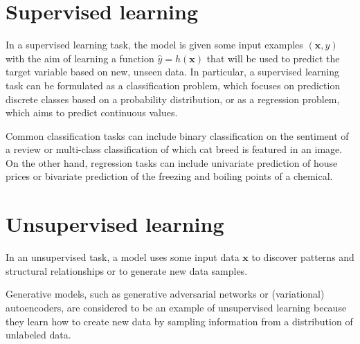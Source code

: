 \documentclass{report}
\begin{document}
\section{Supervised learning}
In a supervised learning task, the model is given some input examples $\displaystyle (\mathbf{x}, y)$ with the aim of learning a function $\displaystyle \hat{y} = h(\mathbf{x})$ that will be used to predict the target variable based on new, unseen data. \newline
In particular, a supervised learning task can be formulated as a classification problem, which focuses on prediction discrete classes based on a probability distribution, or as a regression problem, which aims to predict continuous values.
\begin{examplebox}
    Common classification tasks can include binary classification on the sentiment of a review or multi-class classification of which cat breed is featured in an image. \newline
    On the other hand, regression tasks can include univariate prediction of house prices or bivariate prediction of the freezing and boiling points of a chemical.
\end{examplebox}
\section{Unsupervised learning}
In an unsupervised task, a model uses some input data $\displaystyle \mathbf{x}$ to discover patterns and structural relationships or to generate new data samples.
\begin{examplebox}
    Generative models, such as generative adversarial networks or (variational) autoencoders, are considered to be an example of unsupervised learning because they learn how to create new data by sampling information from a distribution of unlabeled data.
\end{examplebox}
\end{document}
